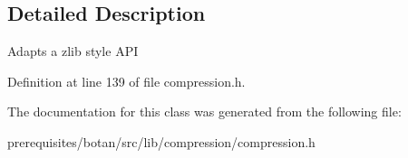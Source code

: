 \subsection{Detailed Description}
Adapts a zlib style A\+PI 

Definition at line 139 of file compression.\+h.



The documentation for this class was generated from the following file\+:\begin{DoxyCompactItemize}
\item 
prerequisites/botan/src/lib/compression/compression.\+h\end{DoxyCompactItemize}
